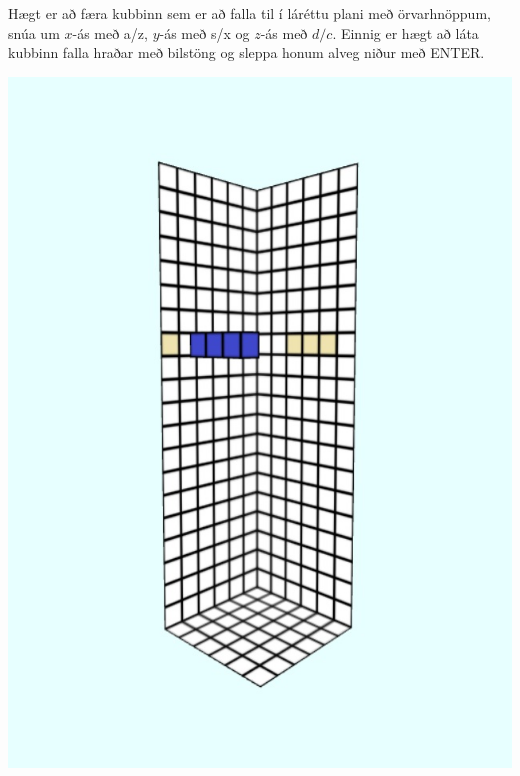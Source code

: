 \documentclass[12pt]{article}
\begin{document}
\begin{small}
\begin{center}
\end{center}
Hægt er að færa kubbinn sem er að falla til í láréttu plani með örvarhnöppum, snúa um $x$-ás með a/z, $y$-ás með s/x og $z$-ás með $d/c$. Einnig er hægt að láta kubbinn falla hraðar með bilstöng og sleppa honum alveg niður með ENTER.
\begin{center}
\includegraphics[scale=0.4]{m2}

\end{center}
\end{small}
\end{document}

